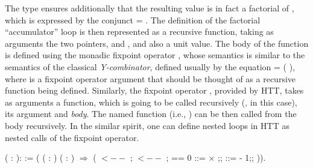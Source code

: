 The type  ensures additionally that the resulting value is in
fact a factorial of , which is expressed by the conjunct  =
 . 
The definition of the factorial ``accumulator'' loop is then represented
as a recursive function, taking as arguments the two pointers,  and
, and also a unit value. The body of the function is defined
using the monadic fixpoint operator , whose semantics
is similar to the semantics of the classical \textit{Y-combinator}, defined
usually by the equation   =  ( ), where  is a fixpoint
operator argument that should be thought of as a recursive function
being defined. Similarly, the fixpoint operator , provided by
HTT, takes as arguments a function, which is going to be called
recursively (, in this case), its argument and \textit{body}. The named
function (i.e., ) can be then called from the body recursively.
In the similar spirit, one can define nested loops in HTT as nested
calls of the fixpoint operator.
\begin{coqdoccode}
\coqdocemptyline
\coqdocnoindent
{}  (  : ):    := \coqdoceol
\coqdocindent{1.00em}
 ( ( :   ) (\coqdocvar{\_} : ) \ensuremath{\Rightarrow} \coqdoceol
\coqdocindent{2.00em}
 ( $\mathtt{<--}$   ;\coqdoceol
\coqdocindent{4.00em}
 $\mathtt{<--}$   ;\coqdoceol
\coqdocindent{4.00em}
  == 0   \coqdoceol
\coqdocindent{4.00em}
  ::=  \ensuremath{\times} ;;\coqdoceol
\coqdocindent{6.50em}
 ::=  - 1;;\coqdoceol
\coqdocindent{6.50em}
 )).\coqdoceol
\coqdocemptyline
\end{coqdoccode}


